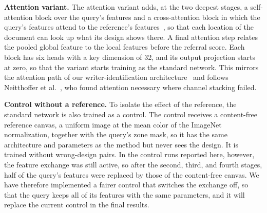 \documentclass[12pt,a4paper]{article}
\newif\ifshowguidance
\newcommand{\todo}[1]{\ifshowguidance\leavevmode{\color{gray}\itshape [#1]}\fi}
\begin{document}
\textbf{Attention variant.} The attention variant adds, at the two deepest stages, a self-attention block over the query's features and a cross-attention block in which the query's features attend to the reference's features~\cite{vaswani2017attention}, so that each location of the document can look up what its design shows there. A final attention step relates the pooled global feature to the local features before the referral score. Each block has six heads with a key dimension of 32, and its output projection starts at zero, so that the variant starts training as the standard network. This mirrors the attention path of our writer-identification architecture~\cite{abushahla2026ijdar} and follows Neitthoffer et al.~\cite{neitthoffer2023knowledge}, who found attention necessary where channel stacking failed.

\textbf{Control without a reference.} To isolate the effect of the reference, the standard network is also trained as a control. The control receives a content-free reference canvas, a uniform image at the mean color of the ImageNet normalization, together with the query's zone mask, so it has the same architecture and parameters as the method but never sees the design. It is trained without wrong-design pairs. In the control runs reported here, however, the feature exchange was still active, so after the second, third, and fourth stages, half of the query's features were replaced by those of the content-free canvas. We have therefore implemented a fairer control that switches the exchange off, so that the query keeps all of its features with the same parameters, and it will replace the current control in the final results. \todo{Fair control with the exchange off (10 runs of Protocol A) pending.}
\end{document}
